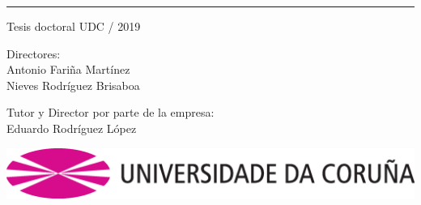\begin{titlepage}


\vspace*{0.9cm}


\vspace*{1.5cm}



\noindent \textcolor{rosaudc}{\rule{\textwidth}{2mm}}

{\large
  \noindent Tesis doctoral UDC / 2019

  \vspace*{1.5cm}

  \noindent Directores: \\Antonio Fari\~na Mart\'inez \\ Nieves Rodr\'iguez Brisaboa
  
  \vspace*{1.0cm}
  
  \noindent Tutor y Director por parte de la empresa: \\Eduardo Rodr\'iguez L\'opez

  \vspace*{1.5cm}

}

\begin{center}
  \vspace*{1.9cm}
  \includegraphics[scale=0.20]{figures/_init/udc-color}
\end{center}


\end{titlepage}

\thispagestyle{empty}

